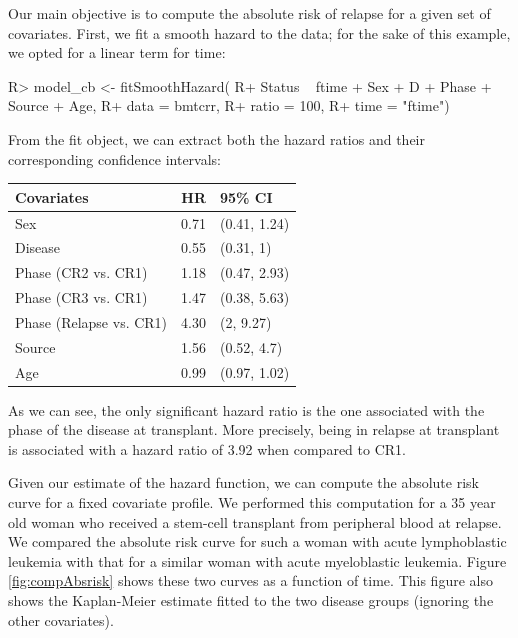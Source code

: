 \documentclass[
]{jss}
\begin{document}
Our main objective is to compute the absolute risk of relapse for a
given set of covariates. First, we fit a smooth hazard to the data; for
the sake of this example, we opted for a linear term for time:

\begin{CodeChunk}

\begin{CodeInput}
R> model_cb <- fitSmoothHazard(
R+     Status ~ ftime + Sex + D + Phase + Source + Age, 
R+     data = bmtcrr, 
R+     ratio = 100, 
R+     time = "ftime")
\end{CodeInput}
\end{CodeChunk}

From the fit object, we can extract both the hazard ratios and their
corresponding confidence intervals:

\begin{CodeChunk}

\begin{tabular}{l|r|l}
\hline
Covariates & HR & 95\% CI\\
\hline
Sex & 0.71 & (0.41, 1.24)\\
\hline
Disease & 0.55 & (0.31, 1)\\
\hline
Phase (CR2 vs. CR1) & 1.18 & (0.47, 2.93)\\
\hline
Phase (CR3 vs. CR1) & 1.47 & (0.38, 5.63)\\
\hline
Phase (Relapse vs. CR1) & 4.30 & (2, 9.27)\\
\hline
Source & 1.56 & (0.52, 4.7)\\
\hline
Age & 0.99 & (0.97, 1.02)\\
\hline
\end{tabular}

\end{CodeChunk}

As we can see, the only significant hazard ratio is the one associated
with the phase of the disease at transplant. More precisely, being in
relapse at transplant is associated with a hazard ratio of 3.92 when
compared to CR1.

Given our estimate of the hazard function, we can compute the absolute
risk curve for a fixed covariate profile. We performed this computation
for a 35 year old woman who received a stem-cell transplant from
peripheral blood at relapse. We compared the absolute risk curve for
such a woman with acute lymphoblastic leukemia with that for a similar
woman with acute myeloblastic leukemia. Figure \ref{fig:compAbsrisk}
shows these two curves as a function of time. This figure also shows the
Kaplan-Meier estimate fitted to the two disease groups (ignoring the
other covariates).
\end{document}
